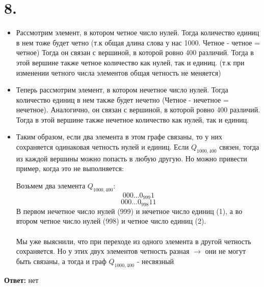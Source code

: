 \documentclass[a4paper,12pt]{article}
\begin{document}
\section*{8.}
\begin{itemize}
\item Рассмотрим элемент, в котором четное число нулей. Тогда количество единиц в нем тоже будет четно (т.к общая длина слова у нас 1000. Четное - четное = четное) Тогда он связан с вершиной, в которой ровно 400 различий. Тогда в этой вершине также четное количество как нулей, так и единиц. (т.к при изменении четного числа элементов общая четность не меняется)
\item Теперь рассмотрим элемент, в котором нечетное число нулей. Тогда количество единиц в нем также будет нечетно (Четное - нечетное = нечетное). Аналогично, он связан с вершиной, в которой ровно 400 различий. Тогда в этой вершине также нечетное количество как нулей, так и единиц.
\item Таким образом, если два элемента в этом графе связаны, то у них сохраняется одинаковая четность нулей и единиц. Если $Q_{1000,400}$ связен, тогда из каждой вершины можно попасть в любую другую. Но можно привести пример, когда это не выполняется:
 
Возьмем два элемента $Q_{1000,400}$:
\[
000\ldots0_{999}1
\]
\[
000\ldots0_{998}11
\]
В первом нечетное число нулей (999) и нечетное число единиц (1), а во втором четное число нулей (998) и четное число единиц (2). 
\\\\
Мы уже выяснили, что при переходе из одного элемента в другой четность сохраняется.  Но у этих двух элементов четность разная $\rightarrow$ они не могут быть связаны, а тогда и граф $Q_{1000,400}$ - несвязный
\end{itemize}
\begin{center}
\textbf{Ответ:} нет
\end{center}
\end{document}
